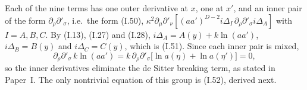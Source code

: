 \documentclass[aps,prd,onecolumn,10pt,nofootinbib,floatfix]{revtex4-2}
\newcommand{\PI}{Paper~I}
\newcommand{\eqI}[1]{(I.#1)}
\begin{document}
Each of the nine terms has one outer derivative at $x$, one at $x'$, and an inner pair of the form
$\partial_\rho\partial'_\sigma$, i.e.\ the form \eqI{50},
$\kappa^2\partial_\mu\partial'_\nu[(aa')^{D-2}i\Delta_I\,\partial_\rho\partial'_\sigma i\Delta_A]$ with $I=A,B,C$.
By \eqI{13}, \eqI{27} and \eqI{28}, $i\Delta_A=A(y)+k\ln(aa')$, $i\Delta_B=B(y)$ and $i\Delta_C=C(y)$,
which is \eqI{51}. Since each inner pair is mixed,
\begin{equation}
\partial_\rho\partial'_\sigma\,k\ln(aa')=k\,\partial_\rho\partial'_\sigma\big[\ln a(\eta)+\ln a(\eta')\big]=0 ,
\label{eq:s4a:lnkill}
\end{equation}
so the inner derivatives eliminate the de Sitter breaking term, as stated in \PI\@. The only nontrivial
equation of this group is \eqI{52}, derived next.
\end{document}
